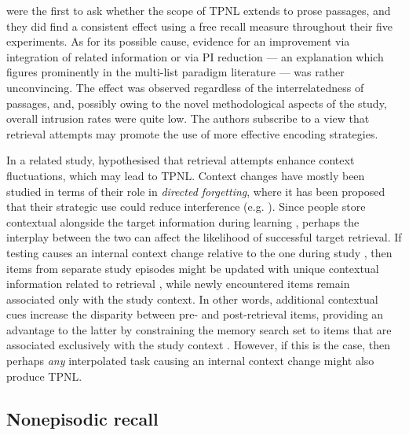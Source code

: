 \documentclass[../main.tex]{subfiles}
\begin{document}
\cite{wissmanInterimTestEffect2011} were the first to ask whether the scope 
of TPNL extends to prose passages, and they did find a consistent effect 
using a free recall measure throughout their five experiments. As for its 
possible cause, evidence for an improvement via integration of related 
information or via PI reduction --- an explanation which figures prominently 
in the multi-list paradigm literature \citep{darleyEffectsPriorFree1971, 
szpunarTestingStudyInsulates2008} --- was rather unconvincing. The effect 
was observed regardless of the interrelatedness of passages, and, possibly 
owing to the novel methodological aspects of the study, overall intrusion 
rates were quite low. The authors subscribe to a view that retrieval 
attempts may promote the use of more effective encoding strategies. 

In a related study, \cite{divisRetrievalSpeedsContext2014} hypothesised that 
retrieval attempts enhance context fluctuations, which may lead to TPNL. 
Context changes have mostly been studied in terms of their role in 
\textit{directed forgetting}, where it has been proposed that their 
strategic use could reduce interference (e.g. 
\citealp{sahakyanContextualChangeAccount2002}). Since people store 
contextual alongside the target information during learning 
\citep{howardDistributedRepresentationTemporal2002,
	tulvingEncodingSpecificityRetrieval1973, 
	mensinkModelInterferenceForgetting1988}, perhaps the 
interplay between the two can affect the likelihood of successful target 
retrieval. If testing causes an internal context change relative to the one 
during study \citep{jangContextRetrievalContext2008}, then items from 
separate study episodes might be updated with unique contextual information 
related to retrieval \citep{karpickeRetrievalBasedLearning2014, 
lehmanEpisodicContextAccount2014}, while newly encountered items remain 
associated only with the study context. In other words, additional 
contextual cues increase the disparity between pre- and post-retrieval 
items, providing an advantage to the latter by constraining the memory 
search set to items that are associated exclusively with the study context 
\citep{szpunarTestingStudyInsulates2008}. However, if this is the case, then 
perhaps \textit{any} interpolated task causing an internal context change 
might also produce TPNL.

\hypertarget{nonepisodic}{%
	\subsection{Nonepisodic recall}}
\end{document}
